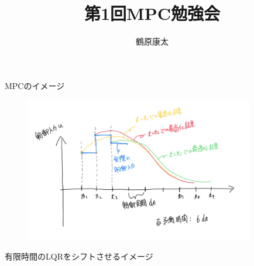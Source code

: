 \documentclass[dvipdfmx,12pt]{beamer}
\title{第1回MPC勉強会}
\author{鶴原康太}
\begin{document}
    \frame{\maketitle}
    
    \begin{frame}{MPCのイメージ}
        \footnotesize
        \begin{figure}[H]
            \centering
            \includegraphics[clip, width = 10.0cm]{takahoribe.png}
        \end{figure}
        \centering
        \tiny{
        }
        \footnotesize
        有限時間のLQRをシフトさせるイメージ
    \end{frame}
\end{document}
